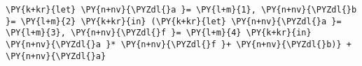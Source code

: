 \begin{Verbatim}[commandchars=\\\{\}]
\PY{k+kr}{let} \PY{n+nv}{\PYZdl{}a }= \PY{l+m}{1}, \PY{n+nv}{\PYZdl{}b }= \PY{l+m}{2} \PY{k+kr}{in} (\PY{k+kr}{let} \PY{n+nv}{\PYZdl{}a }= \PY{l+m}{3}, \PY{n+nv}{\PYZdl{}f }= \PY{l+m}{4} \PY{k+kr}{in} \PY{n+nv}{\PYZdl{}a }* \PY{n+nv}{\PYZdl{}f }+ \PY{n+nv}{\PYZdl{}b)} + \PY{n+nv}{\PYZdl{}a}
\end{Verbatim}
